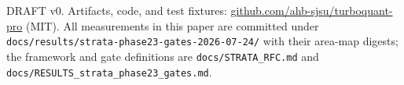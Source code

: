 \documentclass[sigconf, nonacm]{acmart}
\begin{document}
\begin{acks}
DRAFT v0. Artifacts, code, and test fixtures:
\url{github.com/ahb-sjsu/turboquant-pro} (MIT). All measurements in
this paper are committed under
\texttt{docs/results/strata-}\allowbreak\texttt{phase23-gates-2026-07-24/}
with their area-map digests; the framework and gate definitions are
\texttt{docs/STRATA\_RFC.md} and
\texttt{docs/RESULTS\_}\allowbreak\texttt{strata\_phase23\_gates.md}.
\end{acks}

\balance


\end{document}

